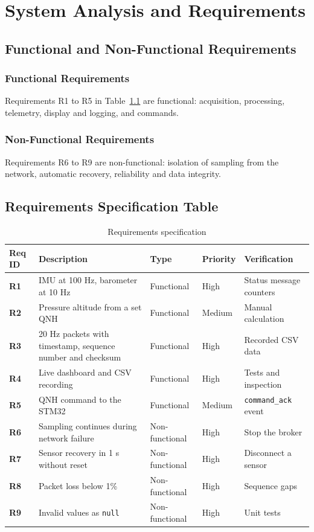 \documentclass[12pt,a4paper]{report}
\begin{document}
\chapter{System Analysis and Requirements}
\section{Functional and Non-Functional Requirements}
\subsection{Functional Requirements}
Requirements R1 to R5 in Table~\ref{tab:requirements} are functional: acquisition, processing, telemetry, display and logging, and commands.

\subsection{Non-Functional Requirements}
Requirements R6 to R9 are non-functional: isolation of sampling from the network, automatic recovery, reliability and data integrity.

\section{Requirements Specification Table}
\begin{table}[H]
\centering
\caption{Requirements specification}
\label{tab:requirements}
\small
\begin{tabularx}{\textwidth}{|p{1.0cm}|X|l|l|X|}
\toprule
\textbf{Req ID} & \textbf{Description} & \textbf{Type} & \textbf{Priority} & \textbf{Verification}\\
\midrule
\textbf{R1} & IMU at 100 Hz, barometer at 10 Hz & Functional & High & Status message counters \\ \hline
\textbf{R2} & Pressure altitude from a set QNH & Functional & Medium & Manual calculation \\ \hline
\textbf{R3} & 20 Hz packets with timestamp, sequence number and checksum & Functional & High & Recorded CSV data \\ \hline
\textbf{R4} & Live dashboard and CSV recording & Functional & High & Tests and inspection \\ \hline
\textbf{R5} & QNH command to the STM32 & Functional & Medium & \texttt{command\_ack} event \\ \hline
\textbf{R6} & Sampling continues during network failure & Non-functional & High & Stop the broker \\ \hline
\textbf{R7} & Sensor recovery in 1 s without reset & Non-functional & High & Disconnect a sensor \\ \hline
\textbf{R8} & Packet loss below 1\% & Non-functional & High & Sequence gaps \\ \hline
\textbf{R9} & Invalid values as \texttt{null} & Non-functional & High & Unit tests \\
\bottomrule
\end{tabularx}
\end{table}
\end{document}
